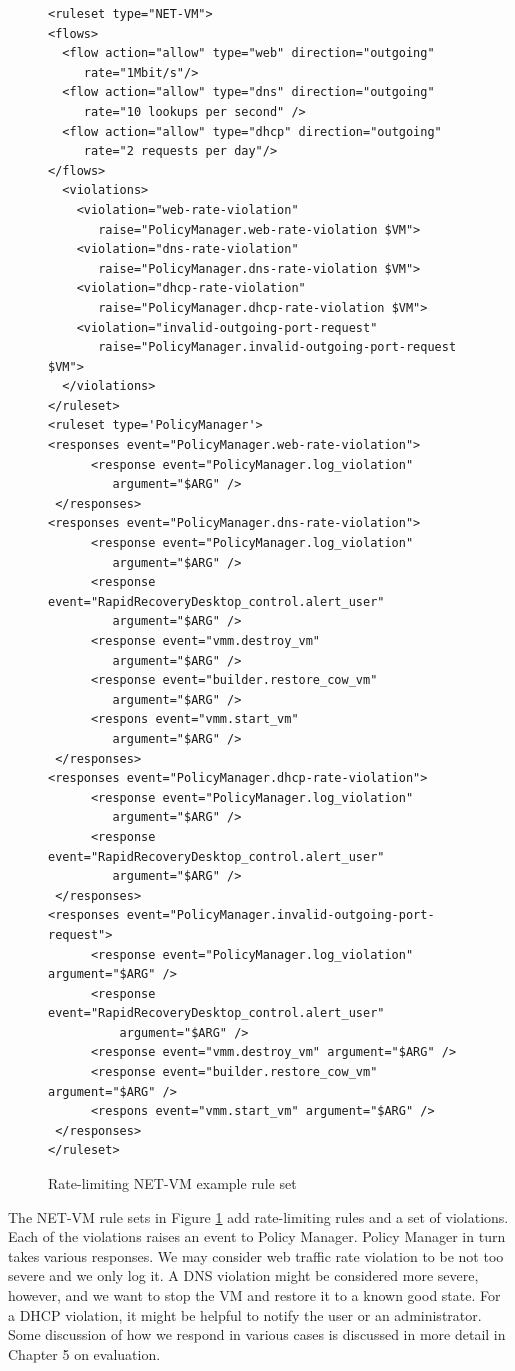 \begin{figure}[tbp]
\caption{Rate-limiting NET-VM example rule set}
\label{lst:net_vm-rate}
\begin{lstlisting}
<ruleset type="NET-VM">
<flows>
  <flow action="allow" type="web" direction="outgoing" 
     rate="1Mbit/s"/>
  <flow action="allow" type="dns" direction="outgoing" 
     rate="10 lookups per second" />
  <flow action="allow" type="dhcp" direction="outgoing" 
     rate="2 requests per day"/>
</flows>
  <violations>
    <violation="web-rate-violation" 
       raise="PolicyManager.web-rate-violation $VM">
    <violation="dns-rate-violation" 
       raise="PolicyManager.dns-rate-violation $VM">
    <violation="dhcp-rate-violation" 
       raise="PolicyManager.dhcp-rate-violation $VM">
    <violation="invalid-outgoing-port-request" 
       raise="PolicyManager.invalid-outgoing-port-request $VM">
  </violations>
</ruleset>
<ruleset type='PolicyManager'>
<responses event="PolicyManager.web-rate-violation">
      <response event="PolicyManager.log_violation" 
         argument="$ARG" />
 </responses>
<responses event="PolicyManager.dns-rate-violation">
      <response event="PolicyManager.log_violation" 
         argument="$ARG" />
      <response event="RapidRecoveryDesktop_control.alert_user" 
         argument="$ARG" />      
      <response event="vmm.destroy_vm" 
         argument="$ARG" />
      <response event="builder.restore_cow_vm" 
         argument="$ARG" />
      <respons event="vmm.start_vm" 
         argument="$ARG" />
 </responses>
<responses event="PolicyManager.dhcp-rate-violation">
      <response event="PolicyManager.log_violation" 
         argument="$ARG" />
      <response event="RapidRecoveryDesktop_control.alert_user" 
         argument="$ARG" />      
 </responses>
<responses event="PolicyManager.invalid-outgoing-port-request">
      <response event="PolicyManager.log_violation" argument="$ARG" />
      <response event="RapidRecoveryDesktop_control.alert_user" 
          argument="$ARG" />      
      <response event="vmm.destroy_vm" argument="$ARG" />
      <response event="builder.restore_cow_vm" argument="$ARG" />
      <respons event="vmm.start_vm" argument="$ARG" />
 </responses>
</ruleset>
\end{lstlisting}
\end{figure}

The NET-VM rule sets in Figure \ref{lst:net_vm-rate} add rate-limiting rules and a set of violations. Each of the violations raises an event to Policy Manager. Policy Manager in turn takes various responses. We may consider web traffic rate violation to be not too severe and we only log it. A DNS violation might be considered more severe, however, and we want to stop the VM and restore it to a known good state. For a DHCP violation, it might be helpful to notify the user or an administrator. Some discussion of how we respond in various cases is discussed in more detail in Chapter 5 on evaluation. 

